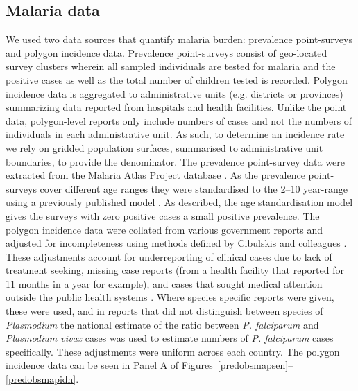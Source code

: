 \documentclass{statsoc}
\begin{document}
\subsection*{Malaria data}

We used two data sources that quantify malaria burden: prevalence point-surveys and polygon incidence data.
Prevalence point-surveys consist of geo-located survey clusters wherein all sampled individuals are tested for malaria and the positive cases as well as the total number of children tested is recorded. 
Polygon incidence data is aggregated to administrative units (e.g. districts or provinces) summarizing data reported from hospitals and health facilities. 
Unlike the point data, polygon-level reports only include numbers of cases and not the numbers of individuals in each administrative unit.  
As such, to determine an incidence rate we rely on gridded population surfaces, summarised to administrative unit boundaries, to provide the denominator. 
The prevalence point-survey data were extracted from the Malaria Atlas Project database \citep{bhatt2015effect, guerra2007assembling, pfeffer2018ma}. 
As the prevalence point-surveys cover different age ranges they were standardised to the 2--10 year-range using a previously published model \citep{smith2007standardizing}. 
As described, the age standardisation model gives the surveys with zero positive cases a small positive prevalence. 
The polygon incidence data were collated from various government reports and adjusted for incompleteness using methods defined by Cibulskis and colleagues \citep{cibulskis2011worldwide, weiss2019mapping}. 
These adjustments account for underreporting of clinical cases due to lack of treatment seeking, missing case reports (from a health facility that reported for 11 months in a year for example), and cases that sought medical attention outside the public health systems \citep{battle2016treatment}. 
Where species specific reports were given, these were used, and in reports that did not distinguish between species of \emph{Plasmodium} the national estimate of the ratio between \emph{P. falciparum} and \emph{Plasmodium vivax} cases was used to estimate numbers of \emph{P. falciparum} cases specifically. 
These adjustments were uniform across each country. 
The polygon incidence data can be seen in Panel A of Figures~\ref{predobsmapsen}--\ref{predobsmapidn}.
\end{document}
